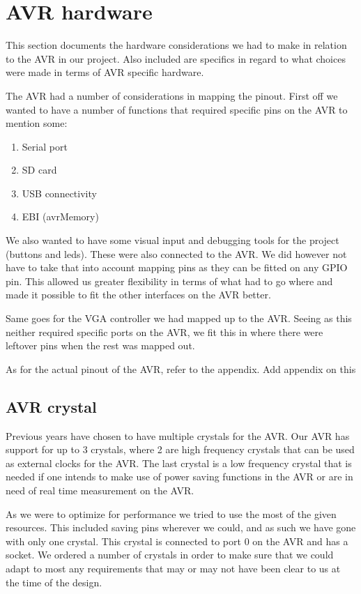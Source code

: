 \section{AVR hardware}

This section documents the hardware considerations we had to make in relation to the AVR in our project. Also included are specifics in regard to what choices were made in terms of AVR specific hardware.

The AVR had a number of considerations in mapping the pinout. First off we wanted to have a number of functions that required specific pins on the AVR to mention some:

\begin{enumerate}
\item Serial port
\item SD card 
\item USB connectivity
\item EBI (avrMemory)
\end{enumerate}

We also wanted to have some visual input and debugging tools for the project (buttons and leds). These were also connected to the AVR. We did however not have to take that into account mapping pins as they can be fitted on any GPIO pin. This allowed us greater flexibility in terms of what had to go where and made it possible to fit the other interfaces on the AVR better.

Same goes for the VGA controller we had mapped up to the AVR. Seeing as this neither required specific ports on the AVR, we fit this in where there were leftover pins when the rest was mapped out.

As for the actual pinout of the AVR, refer to the appendix.
\TODO Add appendix on this

\subsection{AVR crystal}

Previous years have chosen to have multiple crystals for the AVR. Our AVR has support for up to 3 crystals, where 2 are high frequency crystals that can be used as external clocks for the AVR. The last crystal is a low frequency crystal that is needed if one intends to make use of power saving functions in the AVR or are in need of real time measurement on the AVR. 

As we were to optimize for performance we tried to use the most of the given resources. This included saving pins wherever we could, and as such we have gone with only one crystal. This crystal is connected to port 0 on the AVR and has a socket. We ordered a number of crystals in order to make sure that we could adapt to most any requirements that may or may not have been clear to us at the time of the design.

